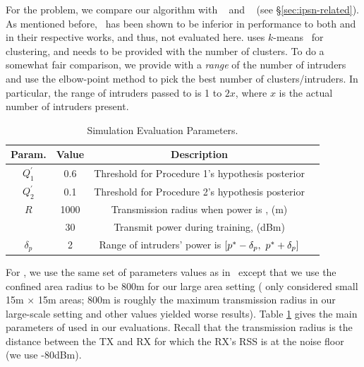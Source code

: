   For the \mtl problem, we compare our
\ouralgo algorithm with \splot~\cite{mobicom17-splot} and
\cl~\cite{clustering} (see \S\ref{sec:ipsn-related}). As mentioned
before,~\cite{Quasi-EM} has been shown to be inferior in performance
to both \splot and \cl in their respective works, and thus, not
evaluated here.
\cl uses $k$-means~\cite{scikit-learn} for clustering, and needs to be
provided with the number of clusters. To do a somewhat fair
comparison, we provide \cl with a {\em range} of the number of
intruders and use the elbow-point method to pick the best
number of clusters/intruders. In particular, the range of intruders
passed to \cl is 1 to $2x$, where $x$ is the actual number of
intruders present.
\begin{table}[ht]
	\caption{Simulation Evaluation Parameters.}
	\centering
	\begin{tabular}{c c c c}
		\hline\hline
		Param. & Value & Description \\ [0.5ex]
		\hline
		$Q^{'}_{1}$ &  0.6   & Threshold for Procedure 1's hypothesis posterior\\ 
		$Q^{'}_{2}$ &  0.1   & Threshold for Procedure 2's hypothesis posterior\\
		$R$  & 1000 & Transmission radius when power is \pstar, (m) \\
		\pstar & 30  & Transmit power during training, (dBm) \\
		$\delta_p$ & 2  & Range of intruders' power is $[p^* - \delta_p, \ p^* + \delta_p]$\\
		\hline
	\end{tabular}
	\label{table:paramaters}
\end{table}

For \splot, we use the same set of parameters values as
in~\cite{mobicom17-splot} except that we use the confined area radius
to be 800m for our large area setting (\cite{mobicom17-splot} only
considered small 15m $\times$ 15m areas; 800m is roughly the maximum
transmission radius in our large-scale setting and other values
yielded worse results).
Table \ref{table:paramaters} gives the main parameters of \ouralgo
used in our evaluations. Recall that the transmission radius is the
distance between the TX and RX for which the RX's RSS is at the noise
floor (we use -80dBm). 

